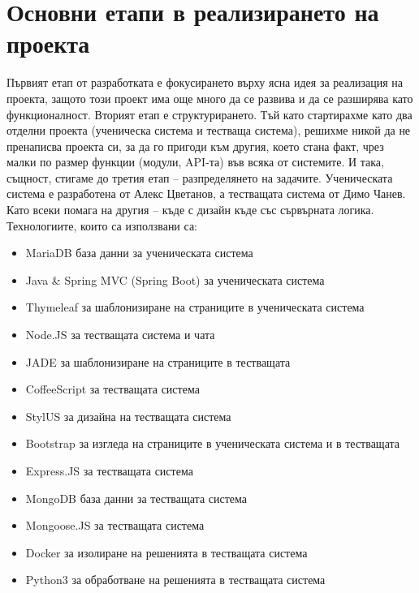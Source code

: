 \documentclass[12pt]{article}
\begin{document}
	\section{Основни етапи в реализирането на проекта}
	Първият етап от разработката е фокусирането върху ясна идея за реализация на проекта, защото този проект има още много да се развива и да се разширява като функционалност. 
	Вторият етап е структурирането.  Тъй като стартирахме като два отделни проекта (ученическа система и тестваща система), решихме никой да не пренаписва проекта си, за да го пригоди към другия, което стана факт, чрез малки по размер функции (модули, API-та) във всяка от системите. 
	И така, същност, стигаме до третия етап – разпределянето на задачите. Ученическата система е разработена от Алекс Цветанов, а тестващата система от Димо Чанев. Като всеки помага на другия – къде с дизайн къде със сървърната логика. \\
	Технологиите, които са използвани са:
	\begin{itemize}
		\item MariaDB база данни за ученическата система
		\item Java \& Spring MVC (Spring Boot) за ученическата система
		\item Thymeleaf за шаблонизиране на страниците в ученическата система
        \\
		\item Node.JS за тестващата система и чата
		\item JADE за шаблонизиране на страниците %
        в тестващата
		\item CoffeeScript за тестващата система
		\item StylUS за дизайна на тестващата система
		\item Bootstrap за изгледа на страниците в ученическата система и в тестващата
		\item Express.JS за тестващата система
		\item MongoDB база данни за тестващата система
		\item Mongoose.JS за тестващата система
		\item Docker за изолиране на решенията в тестващата система
		\item Python3 за обработване на решенията в тестващата система
	\end{itemize}
\end{document}

